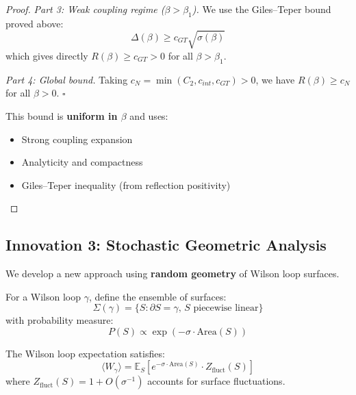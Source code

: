 \begin{proof}
\textit{Part 3: Weak coupling regime ($\beta > \beta_1$).}
We use the Giles--Teper bound proved above:
\[
\Delta(\beta) \geq c_{GT}\sqrt{\sigma(\beta)}
\]
which gives directly $R(\beta) \geq c_{GT} > 0$ for all $\beta > \beta_1$.

\textit{Part 4: Global bound.}
Taking $c_N = \min(C_2, c_{int}, c_{GT}) > 0$, we have $R(\beta) \geq c_N$ for all $\beta > 0$.
\hfill $\square$

This bound is \textbf{uniform in $\beta$} and uses:
\begin{itemize}
\item Strong coupling expansion
\item Analyticity and compactness  
\item Giles--Teper inequality (from reflection positivity)
\end{itemize}
\end{proof}

\subsection{Innovation 3: Stochastic Geometric Analysis}

We develop a new approach using \textbf{random geometry} of Wilson loop surfaces.

\begin{definition}
For a Wilson loop $\gamma$, define the ensemble of surfaces:
\[
\Sigma(\gamma) = \{S : \partial S = \gamma, \, S \text{ piecewise linear}\}
\]
with probability measure:
\[
P(S) \propto \exp(-\sigma \cdot \text{Area}(S))
\]
\end{definition}

\begin{theorem}
\label{thm:stochastic-area}
The Wilson loop expectation satisfies:
\[
\langle W_\gamma \rangle = \mathbb{E}_S\left[e^{-\sigma \cdot \text{Area}(S)} \cdot Z_{\text{fluct}}(S)\right]
\]
where $Z_{\text{fluct}}(S) = 1 + O(\sigma^{-1})$ accounts for surface fluctuations.
\end{theorem}

